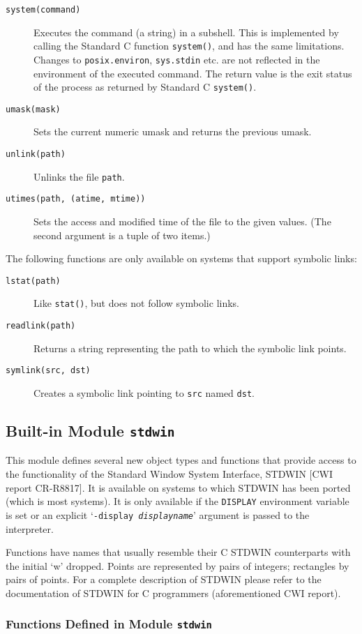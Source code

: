 \begin{description}
\item[{\tt system(command)}]
Executes the command (a string) in a subshell.
This is implemented by calling the Standard C function
{\tt system()},
and has the same limitations.
Changes to
{\tt posix.environ},
{\tt sys.stdin}
etc. are not reflected in the environment of the executed command.
The return value is the exit status of the process as returned by
Standard C
{\tt system()}.
\item[{\tt umask(mask)}]
Sets the current numeric umask and returns the previous umask.
\item[{\tt unlink(path)}]
Unlinks the file
{\tt path}.
\item[{\tt utimes(path, (atime, mtime))}]
Sets the access and modified time of the file to the given values.
(The second argument is a tuple of two items.)
\end{description}

The following functions are only available on systems that support
symbolic links:
\begin{description}
\item[{\tt lstat(path)}]
Like
{\tt stat()},
but does not follow symbolic links.
\item[{\tt readlink(path)}]
Returns a string representing the path to which the symbolic link
points.
\item[{\tt symlink(src, dst)}]
Creates a symbolic link pointing to
{\tt src}
named
{\tt dst}.
\end{description}

\subsection{Built-in Module {\tt stdwin}}

This module defines several new object types and functions that
provide access to the functionality of the Standard Window System
Interface, STDWIN [CWI report CR-R8817].
It is available on systems to which STDWIN has been ported (which is
most systems).
It is only available if the {\tt DISPLAY} environment variable is set
or an explicit `{\tt -display \it displayname}' argument is passed to
the interpreter.

Functions have names that usually resemble their C STDWIN counterparts
with the initial `w' dropped.
Points are represented by pairs of integers; rectangles
by pairs of points.
For a complete description of STDWIN please refer to the documentation
of STDWIN for C programmers (aforementioned CWI report).
\subsubsection{Functions Defined in Module {\tt stdwin}}

